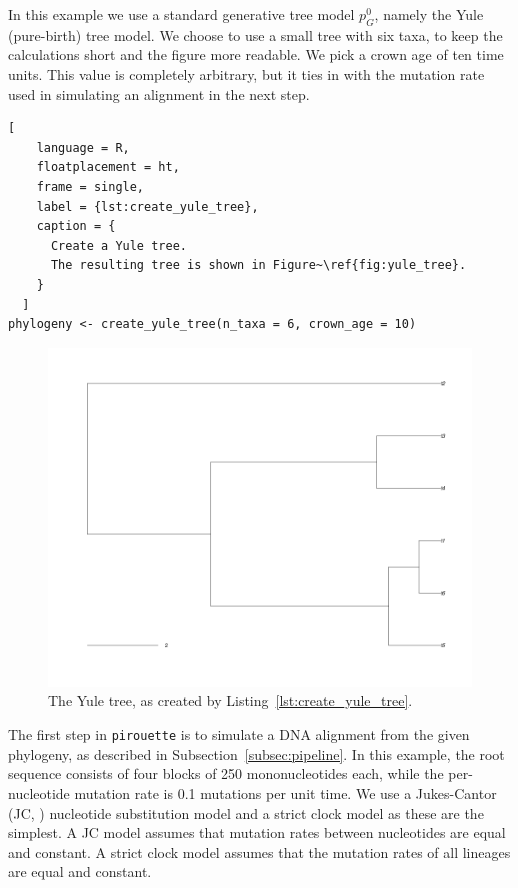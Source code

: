 In this example we use a standard generative tree model $\mathit{p_{G}^0}$, 
namely the Yule (pure-birth) tree model. 
We choose to use a small tree with six taxa, to keep
the calculations short and the figure more readable.
We pick a crown age of ten time units. This value is 
completely arbitrary, but it ties in with the mutation rate 
used in simulating an alignment in the next step.

\begin{lstlisting}[
    language = R,
    floatplacement = ht,
    frame = single, 
    label = {lst:create_yule_tree}, 
    caption = {
      Create a Yule tree. 
      The resulting tree is shown in Figure~\ref{fig:yule_tree}.
    }
  ]
phylogeny <- create_yule_tree(n_taxa = 6, crown_age = 10)
\end{lstlisting}

\begin{figure}[ht]
  \includegraphics[width=\textwidth]{pirouette_example_1/example_1_314/true_tree.png}
  \caption{The Yule tree, as created by Listing~\ref{lst:create_yule_tree}.}
  \label{fig:yule_tree}
\end{figure}

The first step in \verb;pirouette; is to simulate a DNA alignment from the 
given phylogeny, as described in Subsection~\ref{subsec:pipeline}.
In this example, the root sequence consists of four blocks of 250 
mononucleotides each, while the per-nucleotide mutation rate is 
0.1 mutations per unit time.
We use a Jukes-Cantor (JC, \cite{jukes1969evolution}) nucleotide substitution model
and a strict clock model as these are the simplest.
A JC model assumes that mutation rates between nucleotides are equal and 
constant. 
A strict clock model assumes that the mutation rates 
of all lineages are equal and constant.

